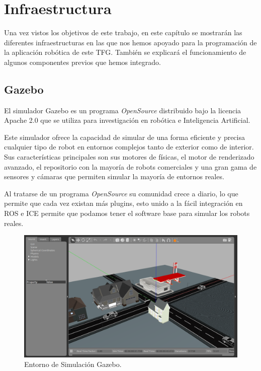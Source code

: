 \chapter{Infraestructura}\label{cap.infraestructura}
\hspace{1cm} Una vez vistos los objetivos de este trabajo, en este capítulo se mostrarán las diferentes infraestructuras en las que nos hemos apoyado para la programación de la aplicación robótica de este TFG. También se explicará el funcionamiento de algunos componentes previos que hemos integrado.

\section{Gazebo}
\hspace{1cm} El simulador Gazebo es un programa \textit{OpenSource} distribuido bajo la licencia Apache 2.0 que se utiliza para investigación en robótica e Inteligencia Artificial.

\hspace{1cm} Este simulador ofrece la capacidad de simular de una forma eficiente y precisa cualquier tipo de robot en entornos complejos tanto de exterior como de interior. Sus características principales son sus motores de físicas, el motor de renderizado avanzado, el repositorio con la mayoría de robots comerciales y una gran gama de sensores y cámaras que permiten simular la mayoría de entornos reales.

\hspace{1cm} Al tratarse de un programa \textit{OpenSource} su comunidad crece a diario, lo que permite que cada vez existan más plugins, esto unido a la fácil integración en ROS e ICE permite que podamos tener el software base para simular los robots reales.
\\

\begin{figure}[H]
	\begin{center}
		\includegraphics[width=1\textwidth]{imag/IMG18.png}
				\caption{Entorno de Simulación Gazebo.} 
	\label{fig:Gazebo.}	
	\end{center}
\end{figure}


